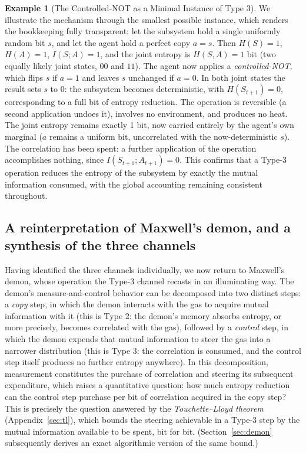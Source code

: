 \documentclass[10pt]{article}
\theoremstyle{definition}
\newtheorem{example}[theorem]{Example}
\theoremstyle{remark}
\begin{document}
\begin{example}[The Controlled-NOT as a Minimal Instance of Type 3]
\label{ex:cnot}
We illustrate the mechanism through the smallest possible instance, which renders the bookkeeping fully transparent: let the subsystem hold a single uniformly random bit $s$, and let the agent hold a perfect copy $a = s$. Then $H(S) = 1$, $H(A) = 1$, $I(S;A) = 1$, and the joint entropy is $H(S, A) = 1$ bit (two equally likely joint states, $00$ and $11$). The agent now applies a \emph{controlled-NOT}, which flips $s$ if $a = 1$ and leaves $s$ unchanged if $a = 0$. In both joint states the result sets $s$ to $0$: the subsystem becomes deterministic, with $H(S_{t+1}) = 0$, corresponding to a full bit of entropy reduction. The operation is reversible (a second application undoes it), involves no environment, and produces no heat. The joint entropy remains exactly 1 bit, now carried entirely by the agent's own marginal ($a$ remains a uniform bit, uncorrelated with the now-deterministic $s$). The correlation has been spent: a further application of the operation accomplishes nothing, since $I(S_{t+1}; A_{t+1}) = 0$. This confirms that a Type-3 operation reduces the entropy of the subsystem by exactly the mutual information consumed, with the global accounting remaining consistent throughout.
\end{example}

\subsection{A reinterpretation of Maxwell's demon, and a synthesis of the three channels}
\label{sec:demonreframe}

Having identified the three channels individually, we now return to Maxwell's demon, whose operation the Type-3 channel recasts in an illuminating way. The demon's measure-and-control behavior can be decomposed into two distinct steps: a \emph{copy} step, in which the demon interacts with the gas to acquire mutual information with it (this is Type 2: the demon's memory absorbs entropy, or more precisely, becomes correlated with the gas), followed by a \emph{control} step, in which the demon expends that mutual information to steer the gas into a narrower distribution (this is Type 3: the correlation is consumed, and the control step itself produces no further entropy anywhere). In this decomposition, measurement constitutes the purchase of correlation and steering its subsequent expenditure, which raises a quantitative question: how much entropy reduction can the control step purchase per bit of correlation acquired in the copy step? This is precisely the question answered by the \emph{Touchette--Lloyd theorem} (Appendix~\ref{sec:tl}), which bounds the steering achievable in a Type-3 step by the mutual information available to be spent, bit for bit. (Section~\ref{sec:demon} subsequently derives an exact algorithmic version of the same bound.)
\end{document}
